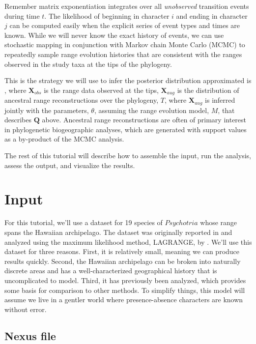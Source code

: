 \documentclass[11pt]{article}
\begin{document}
Remember matrix exponentiation integrates over all \textit{unobserved} transition events during time $t$.
The likelihood of beginning in character $i$ and ending in character $j$ can be computed easily when the explicit series of event types and times are known.
While we will never know the exact history of events, we can use stochastic mapping in conjunction with Markov chain Monte Carlo (MCMC) to repeatedly sample range evolution histories that are consistent with the ranges observed in the study taxa at the tips of the phylogeny.

This is the strategy we will use to infer the posterior distribution approximated is 
, where $\textbf{X}_{obs}$ is the range data observed at the tips, $\textbf{X}_{aug}$ is the distribution of ancestral range reconstructions over the phylogeny, $T$, where $\textbf{X}_{aug}$ is inferred jointly with the parameters, $\theta$, assuming the range evolution model, $M$, that describes $\textbf{Q}$ above.
Ancestral range reconstructions are often of primary interest in phylogenetic biogeographic analyses, which are generated with support values as a by-product of the MCMC analysis.

The rest of this tutorial will describe how to assemble the input, run the analysis, assess the output, and visualize the results.

\newpage

\section{Input}

For this tutorial, we'll use a dataset for 19 species of $Psychotria$ whose range spans the Hawaiian archipelago.
The dataset was originally reported in \citet{nepokroeff03} and analyzed using the maximum likelihood method, LAGRANGE, by \citet{ree08}.
We'll use this dataset for three reasons.
First, it is relatively small, meaning we can produce results quickly.
Second, the Hawaiian archipelago can be broken into naturally discrete areas and has a well-characterized geographical history that is uncomplicated to model.
Third, it has previously been analyzed, which provides some basis for comparison to other methods.
To simplify things, this model will assume we live in a gentler world where presence-absence characters are known without error.

\subsection{Nexus file}
\end{document}
